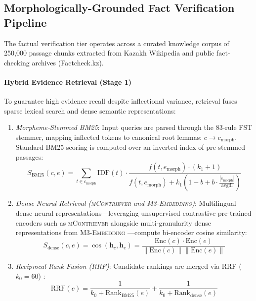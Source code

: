 \subsection{Morphologically-Grounded Fact Verification Pipeline}
The factual verification tier operates across a curated knowledge corpus of 250,000 passage chunks extracted from Kazakh Wikipedia and public fact-checking archives (Factcheck.kz).

\paragraph{Hybrid Evidence Retrieval (Stage 1)}
To guarantee high evidence recall despite inflectional variance, retrieval fuses sparse lexical search and dense semantic representations:
\begin{enumerate}[leftmargin=*, label=(\alph*)]
    \item \textit{Morpheme-Stemmed BM25}: Input queries are parsed through the 83-rule FST stemmer, mapping inflected tokens to canonical root lemmas: $c \to c_{\text{morph}}$. Standard BM25 scoring is computed over an inverted index of pre-stemmed passages:
    \begin{equation}
        S_{\text{BM25}}(c, e) = \sum_{t \in c_{\text{morph}}} \text{IDF}(t) \cdot \frac{f(t, e_{\text{morph}}) \cdot (k_1 + 1)}{f(t, e_{\text{morph}}) + k_1 \left(1 - b + b \cdot \frac{|e_{\text{morph}}|}{\text{avgdl}}\right)}
    \end{equation}
    \item \textit{Dense Neural Retrieval (\textsc{mContriever} and \textsc{M3-Embedding})}: Multilingual dense neural representations---leveraging unsupervised contrastive pre-trained encoders such as \textsc{mContriever} \cite{izacard2022mcontriever} alongside multi-granularity dense representations from \textsc{M3-Embedding} \cite{chen-etal-2024-m3}---compute bi-encoder cosine similarity:
    \begin{equation}
        S_{\text{dense}}(c, e) = \cos(\mathbf{h}_c, \mathbf{h}_e) = \frac{\text{Enc}(c) \cdot \text{Enc}(e)}{\|\text{Enc}(c)\| \|\text{Enc}(e)\|}
    \end{equation}
    \item \textit{Reciprocal Rank Fusion (RRF)}: Candidate rankings are merged via RRF ($k_0 = 60$) \cite{cormack2009rrf}:
    \begin{equation}
        \text{RRF}(e) = \frac{1}{k_0 + \text{Rank}_{\text{BM25}}(e)} + \frac{1}{k_0 + \text{Rank}_{\text{dense}}(e)}
    \end{equation}
\end{enumerate}

